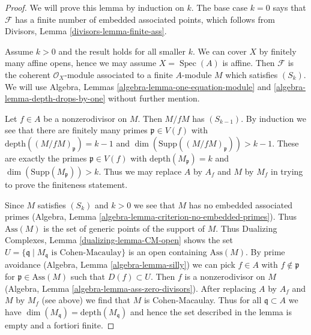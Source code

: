 \documentclass{stacks-project}
\theoremstyle{plain}
\theoremstyle{definition}
\theoremstyle{remark}
\numberwithin{equation}{subsection}
\def\Spec{\mathop{\mathrm{Spec}}}
\begin{document}
\begin{proof}
We will prove this lemma by induction on $k$. The base case $k = 0$
says that $\mathcal{F}$ has a finite number of embedded associated points,
which follows from Divisors, Lemma \ref{divisors-lemma-finite-ass}.

\medskip\noindent
Assume $k > 0$ and the result holds for all smaller $k$.
We can cover $X$ by finitely many affine opens, hence we may
assume $X = \Spec(A)$ is affine. Then $\mathcal{F}$ is the
coherent $\mathcal{O}_X$-module associated to a finite $A$-module $M$
which satisfies $(S_k)$. We will use
Algebra, Lemmas \ref{algebra-lemma-one-equation-module} and
\ref{algebra-lemma-depth-drops-by-one}
without further mention.

\medskip\noindent
Let $f \in A$ be a nonzerodivisor on $M$. Then $M/fM$ has $(S_{k - 1})$.
By induction we see that there are finitely many
primes $\mathfrak p \in V(f)$ with
$\text{depth}((M/fM)_\mathfrak p) = k - 1$ and
$\dim(\text{Supp}((M/fM)_\mathfrak p)) > k - 1$.
These are exactly the primes $\mathfrak p \in V(f)$ with
$\text{depth}(M_\mathfrak p) = k$ and
$\dim(\text{Supp}(M_\mathfrak p)) > k$.
Thus we may replace $A$ by $A_f$ and $M$ by $M_f$
in trying to prove the finiteness statement.

\medskip\noindent
Since $M$ satisfies $(S_k)$ and $k > 0$ we see that $M$ has no
embedded associated primes
(Algebra, Lemma \ref{algebra-lemma-criterion-no-embedded-primes}).
Thus $\text{Ass}(M)$ is the set of generic points of the support
of $M$. Thus Dualizing Complexes, Lemma \ref{dualizing-lemma-CM-open}
shows the set
$U = \{\mathfrak q \mid M_\mathfrak q\text{ is Cohen-Macaulay}\}$
is an open containing $\text{Ass}(M)$.
By prime avoidance (Algebra, Lemma \ref{algebra-lemma-silly})
we can pick $f \in A$ with
$f \not \in \mathfrak p$ for $\mathfrak p \in \text{Ass}(M)$
such that $D(f) \subset U$.
Then $f$ is a nonzerodivisor on $M$
(Algebra, Lemma \ref{algebra-lemma-ass-zero-divisors}).
After replacing $A$ by $A_f$ and $M$ by $M_f$ (see above) we
find that $M$ is Cohen-Macaulay.
Thus for all $\mathfrak q \subset A$ we have
$\dim(M_\mathfrak q) = \text{depth}(M_\mathfrak q)$
and hence the set described in the lemma is empty
and a fortiori finite.
\end{proof}
\end{document}
